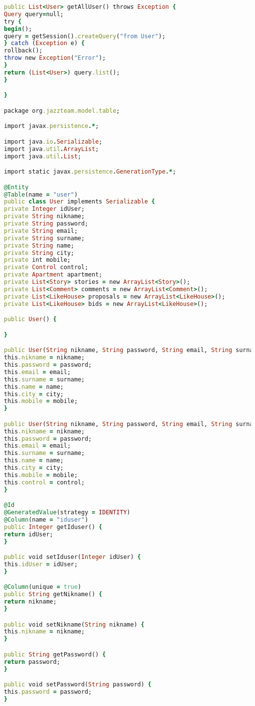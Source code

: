 \begin{lstlisting}[language=Ruby, style=rubystyle]
public List<User> getAllUser() throws Exception {
Query query=null;
try {
begin();
query = getSession().createQuery("from User");
} catch (Exception e) {
rollback();
throw new Exception("Error");
}
return (List<User>) query.list();
}

}

package org.jazzteam.model.table;

import javax.persistence.*;

import java.io.Serializable;
import java.util.ArrayList;
import java.util.List;

import static javax.persistence.GenerationType.*;

@Entity
@Table(name = "user")
public class User implements Serializable {
private Integer idUser;
private String nikname;
private String password;
private String email;
private String surname;
private String name;
private String city;
private int mobile;
private Control control;
private Apartment apartment;
private List<Story> stories = new ArrayList<Story>();
private List<Comment> comments = new ArrayList<Comment>();
private List<LikeHouse> proposals = new ArrayList<LikeHouse>();
private List<LikeHouse> bids = new ArrayList<LikeHouse>();

public User() {

}

public User(String nikname, String password, String email, String surname, String name, String city, int mobile) {
this.nikname = nikname;
this.password = password;
this.email = email;
this.surname = surname;
this.name = name;
this.city = city;
this.mobile = mobile;
}

public User(String nikname, String password, String email, String surname, String name, String city, int mobile, Control control) {
this.nikname = nikname;
this.password = password;
this.email = email;
this.surname = surname;
this.name = name;
this.city = city;
this.mobile = mobile;
this.control = control;
}

@Id
@GeneratedValue(strategy = IDENTITY)
@Column(name = "iduser")
public Integer getIduser() {
return idUser;
}

public void setIduser(Integer idUser) {
this.idUser = idUser;
}

@Column(unique = true)
public String getNikname() {
return nikname;
}

public void setNikname(String nikname) {
this.nikname = nikname;
}

public String getPassword() {
return password;
}

public void setPassword(String password) {
this.password = password;
}


\end{lstlisting}
